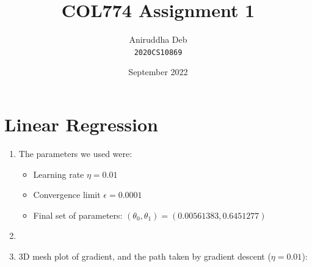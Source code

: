 \documentclass[12pt]{article}
\title{\textbf{COL774 Assignment 1}}
\author{Aniruddha Deb \\ \texttt{2020CS10869}}
\date{September 2022}
\begin{document}
\maketitle

\section*{Linear Regression}

\begin{enumerate}[label=(\alph*)]
    \item The parameters we used were:
    \begin{itemize}
        \item Learning rate $\eta = 0.01$
        \item Convergence limit $\epsilon = 0.0001$
        \item Final set of parameters: $(\theta_0,\theta_1) = (0.00561383,0.6451277)$
    \end{itemize}

    \item \begin{center}\end{center}

    \item \begin{center}3D mesh plot of gradient, and the path taken by gradient descent ($\eta = 0.01$): \end{center}


\end{enumerate}
\end{document}
